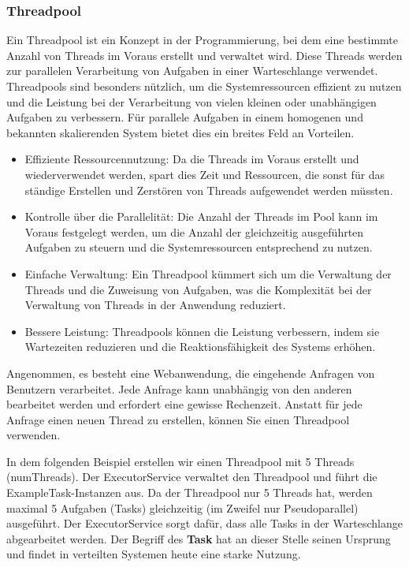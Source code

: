 \documentclass[../vs-script-first-v01.tex]{subfiles}
\begin{document}
\subsubsection{Threadpool}
Ein Threadpool ist ein Konzept in der Programmierung, bei dem eine bestimmte Anzahl von Threads im Voraus erstellt und verwaltet wird. Diese Threads werden zur parallelen Verarbeitung von Aufgaben in einer Warteschlange verwendet. Threadpools sind besonders nützlich, um die Systemressourcen effizient zu nutzen und die Leistung bei der Verarbeitung von vielen kleinen oder unabhängigen Aufgaben zu verbessern. Für parallele Aufgaben in einem homogenen und bekannten skalierenden System bietet dies ein breites Feld an Vorteilen. 
\begin{itemize}
\item Effiziente Ressourcennutzung: Da die Threads im Voraus erstellt und wiederverwendet werden, spart dies Zeit und Ressourcen, die sonst für das ständige Erstellen und Zerstören von Threads aufgewendet werden müssten.
\item Kontrolle über die Parallelität: Die Anzahl der Threads im Pool kann im Voraus festgelegt werden, um die Anzahl der gleichzeitig ausgeführten Aufgaben zu steuern und die Systemressourcen entsprechend zu nutzen.
\item Einfache Verwaltung: Ein Threadpool kümmert sich um die Verwaltung der Threads und die Zuweisung von Aufgaben, was die Komplexität bei der Verwaltung von Threads in der Anwendung reduziert.
\item Bessere Leistung: Threadpools können die Leistung verbessern, indem sie Wartezeiten reduzieren und die Reaktionsfähigkeit des Systems erhöhen.
\end{itemize}
Angenommen, es besteht eine Webanwendung, die eingehende Anfragen von Benutzern verarbeitet. Jede Anfrage kann unabhängig von den anderen bearbeitet werden und erfordert eine gewisse Rechenzeit. Anstatt für jede Anfrage einen neuen Thread zu erstellen, können Sie einen Threadpool verwenden. 

In dem folgenden Beispiel erstellen wir einen Threadpool mit 5 Threads (numThreads). Der ExecutorService verwaltet den Threadpool und führt die ExampleTask-Instanzen aus. Da der Threadpool nur 5 Threads hat, werden maximal 5 Aufgaben (Tasks) gleichzeitig (im Zweifel nur Pseudoparallel) ausgeführt. Der ExecutorService sorgt dafür, dass alle Tasks in der Warteschlange abgearbeitet werden. Der Begriff des \textbf{Task} hat an dieser Stelle seinen Ursprung und findet in verteilten Systemen heute eine starke Nutzung.
\end{document}
